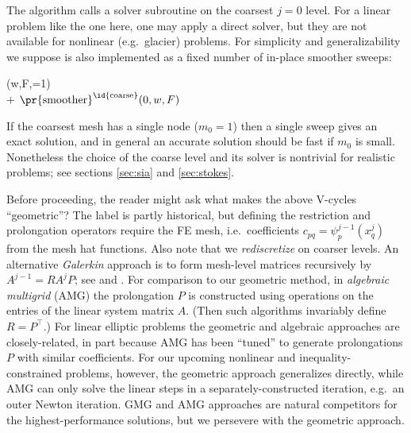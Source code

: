 \documentclass[letterpaper,final,12pt,reqno]{amsart}
\theoremstyle{claim}
\numberwithin{equation}{section}
\numberwithin{figure}{section}
\numberwithin{table}{section}
\numberwithin{theorem}{section}
\begin{document}
The algorithm calls a solver subroutine on the coarsest $j=0$ level.  For a linear problem like the one here, one may apply a direct solver, but they are not available for nonlinear (e.g.~glacier) problems.  For simplicity and generalizability we suppose  is also implemented as a fixed number of in-place smoother sweeps:
\begin{pseudo*} \label{ps:gmg-coarsesolve}
(w,F,=1)\text{:} \\+
    $\text{\pr{smoother}}^{\text{\id{coarse}}}(0,w,F)$ \\
\end{pseudo*}
If the coarsest mesh has a single node ($m_0=1$) then a single sweep gives an exact solution, and in general an accurate solution should be fast if $m_0$ is small.  Nonetheless the choice of the coarse level and its solver is nontrivial for realistic problems; see sections \ref{sec:sia} and \ref{sec:stokes}.

Before proceeding, the reader might ask what makes the above V-cycles ``geometric''?  The label is partly historical, but defining the restriction and prolongation operators require the FE mesh, i.e.~coefficients $c_{pq} = \psi_p^{j-1}(x_q^j)$ from the mesh hat functions.  Also note that we \emph{rediscretize} on coarser levels.  An alternative \emph{Galerkin} approach is to form mesh-level matrices recursively by $A^{j-1} = R A^j P$; see \cite{Bueler2021} and \cite[Chapter V]{Braess2007}.  For comparison to our geometric method, in \emph{algebraic multigrid} (AMG) \cite{Trottenbergetal2001} the prolongation $P$ is constructed using operations on the entries of the linear system matrix $A$.  (Then such algorithms invariably define $R=P^\top$.)  For linear elliptic problems the geometric and algebraic approaches are closely-related, in part because AMG has been ``tuned'' to generate prolongations $P$ with similar coefficients.  For our upcoming nonlinear and inequality-constrained problems, however, the geometric approach generalizes directly, while AMG can only solve the linear steps in a separately-constructed iteration, e.g.~an outer Newton iteration.  GMG and AMG approaches are natural competitors for the highest-performance solutions, but we persevere with the geometric approach.
\end{document}
